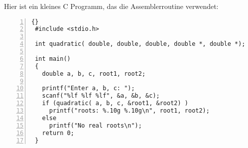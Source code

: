Hier ist ein kleines C Programm, das die Assemblerroutine verwendet:
\pagebreak {} \vspace{-0.250em}
\begin{lstlisting}[numbers=left]{}
 #include <stdio.h>

 int quadratic( double, double, double, double *, double *);

 int main()
 {
   double a, b, c, root1, root2;

   printf("Enter a, b, c: ");
   scanf("%lf %lf %lf", &a, &b, &c);
   if (quadratic( a, b, c, &root1, &root2) )
     printf("roots: %.10g %.10g\n", root1, root2);
   else
     printf("No real roots\n");
   return 0;
 }
\end{lstlisting}
\vspace{-0.50em} 

